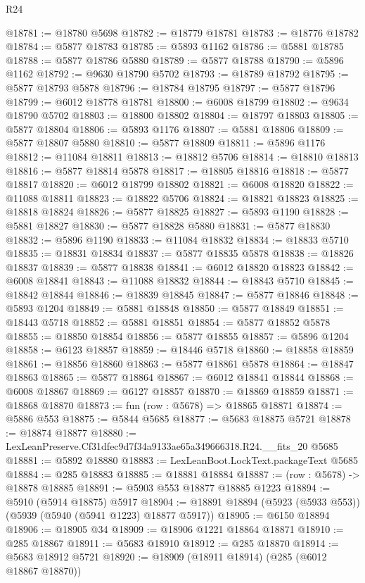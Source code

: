 \begin{lexlean}{R24}
\begin{coremodule}
@18781 := @18780 @5698
@18782 := @18779 @18781
@18783 := @18776 @18782
@18784 := @5877 @18783
@18785 := @5893 @1162
@18786 := @5881 @18785
@18788 := @5877 @18786 @5880
@18789 := @5877 @18788
@18790 := @5896 @1162
@18792 := @9630 @18790 @5702
@18793 := @18789 @18792
@18795 := @5877 @18793 @5878
@18796 := @18784 @18795
@18797 := @5877 @18796
@18799 := @6012 @18778 @18781
@18800 := @6008 @18799
@18802 := @9634 @18790 @5702
@18803 := @18800 @18802
@18804 := @18797 @18803
@18805 := @5877 @18804
@18806 := @5893 @1176
@18807 := @5881 @18806
@18809 := @5877 @18807 @5880
@18810 := @5877 @18809
@18811 := @5896 @1176
@18812 := @11084 @18811
@18813 := @18812 @5706
@18814 := @18810 @18813
@18816 := @5877 @18814 @5878
@18817 := @18805 @18816
@18818 := @5877 @18817
@18820 := @6012 @18799 @18802
@18821 := @6008 @18820
@18822 := @11088 @18811
@18823 := @18822 @5706
@18824 := @18821 @18823
@18825 := @18818 @18824
@18826 := @5877 @18825
@18827 := @5893 @1190
@18828 := @5881 @18827
@18830 := @5877 @18828 @5880
@18831 := @5877 @18830
@18832 := @5896 @1190
@18833 := @11084 @18832
@18834 := @18833 @5710
@18835 := @18831 @18834
@18837 := @5877 @18835 @5878
@18838 := @18826 @18837
@18839 := @5877 @18838
@18841 := @6012 @18820 @18823
@18842 := @6008 @18841
@18843 := @11088 @18832
@18844 := @18843 @5710
@18845 := @18842 @18844
@18846 := @18839 @18845
@18847 := @5877 @18846
@18848 := @5893 @1204
@18849 := @5881 @18848
@18850 := @5877 @18849
@18851 := @18443 @5718
@18852 := @5881 @18851
@18854 := @5877 @18852 @5878
@18855 := @18850 @18854
@18856 := @5877 @18855
@18857 := @5896 @1204
@18858 := @6123 @18857
@18859 := @18446 @5718
@18860 := @18858 @18859
@18861 := @18856 @18860
@18863 := @5877 @18861 @5878
@18864 := @18847 @18863
@18865 := @5877 @18864
@18867 := @6012 @18841 @18844
@18868 := @6008 @18867
@18869 := @6127 @18857
@18870 := @18869 @18859
@18871 := @18868 @18870
@18873 := fun (row : @5678) => @18865 @18871
@18874 := @5886 @553
@18875 := @5844 @5685
@18877 := @5683 @18875 @5721
@18878 := @18874 @18877
@18880 := LexLeanPreserve.Cf31dfec9d7f34a9133ae65a349666318.R24.__fits_20 @5685
@18881 := @5892 @18880
@18883 := LexLeanBoot.LockText.packageText @5685
@18884 := @285 @18883
@18885 := @18881 @18884
@18887 := (row : @5678) -> @18878 @18885
@18891 := @5903 @553 @18877 @18885 @1223
@18894 := @5910 (@5914 @18875) @5917
@18904 := @18891 @18894 (@5923 (@5933 @553)) (@5939 (@5940 (@5941 @1223) @18877 @5917))
@18905 := @6150 @18894
@18906 := @18905 @34
@18909 := @18906 @1221 @18864 @18871
@18910 := @285 @18867
@18911 := @5683 @18910
@18912 := @285 @18870
@18914 := @5683 @18912 @5721
@18920 := @18909 (@18911 @18914) (@285 (@6012 @18867 @18870))

\end{coremodule}
\end{lexlean}
